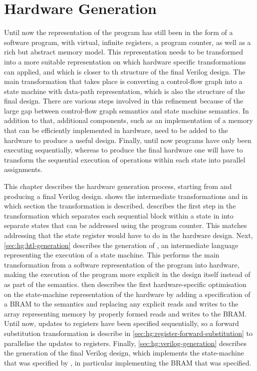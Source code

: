 \chapter{Hardware Generation}%
\label{sec:hardware-generation}

Until now the representation of the program has still been in the form of a
software program, with virtual, infinite registers, a program counter, as well
as a rich but abstract memory model.  This representation needs to be
transformed into a more suitable representation on which hardware specific
transformations can applied, and which is closer to th structure of the final
Verilog design.  The main transformation that takes place is converting a
control-flow graph into a state machine with data-path representation, which is
also the structure of the final design.  There are various steps involved in
this refinement because of the large gap between control-flow graph semantics
and state machine semantics.  In addition to that, additional components, such
as an implementation of a memory that can be efficiently implemented in
hardware, need to be added to the hardware to produce a useful design.  Finally,
until now programs have only been executing sequentially, whereas to produce the
final hardware one will have to transform the sequential execution of operations
within each state into parallel assignments.

This chapter describes the hardware generation process, starting from \rtlpar{}
and producing a final Verilog design.
 shows the intermediate
transformations and in which section the transformation is described.
 describes the first step in the
transformation which separates each sequential block within a state in \rtlpar{}
into separate states that can be addressed using the program counter.  This
matches addressing that the state register would have to do in the hardware
design. Next, \cref{sec:hg:htl-generation} describes the generation of \htl{},
an intermediate language representing the execution of a state machine.  This
performs the main transformation from a software representation of the program
into hardware, making the execution of the program more explicit in the design
itself instead of as part of the semantics.   then
describes the first hardware-specific optimisation on the state-machine
representation of the hardware by adding a specification of a \gls{BRAM} to the
\htl{} semantics and replacing any explicit reads and writes to the array
representing memory by properly formed reads and writes to the \gls{BRAM}.
Until now, updates to registers have been specified sequentially, so a forward
substitution transformation is describe in
\cref{sec:hg:register-forward-substitution} to parallelise the updates to
registers.  Finally, \cref{sec:hg:verilog-generation} describes the generation
of the final Verilog design, which implements the state-machine that was
specified by \htl{}, in particular implementing the \gls{BRAM} that was
specified.

